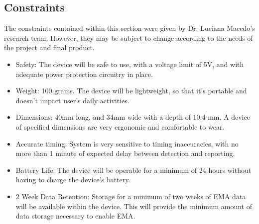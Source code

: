 \documentclass[12pt]{article}
\begin{document}
\subsection{Constraints}
The constraints contained within this section were given by Dr. Luciana Macedo's research team. However, they may be subject to change according to the needs of the project and final product.
\begin{itemize}
    \item Safety: The device will be safe to use, with a voltage limit of 5V, and with adequate power protection circuitry in place.
    \item Weight: 100 grams. The device will be lightweight, so that it's portable and doesn't impact user's daily activities.
    \item Dimensions: 40mm long, and 34mm wide with a depth of 10.4 mm. A device of specified dimensions are very ergonomic and comfortable to wear.
    \item Accurate timing: System is very sensitive to timing inaccuracies, with no more than 1 minute of expected delay between detection and reporting.
    \item Battery Life: The device will be operable for a minimum of 24 hours without having to charge the device's battery.
    \item 2 Week Data Retention: Storage for a minimum of two weeks of EMA data will be available within the device. This will provide the minimum amount of data storage necessary to enable EMA.
\end{itemize}

\pagebreak
\end{document}
